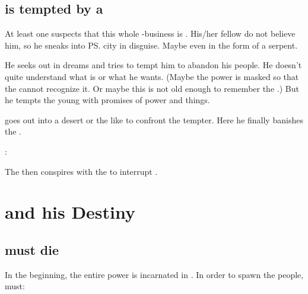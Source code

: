 \subsection{\Thanatzil{} is tempted by a \dragon}
At least one \dragon{} suspects that this whole \Thanatzil-business is . His/her fellow \dragons{} do not believe him, so he sneaks into \ps{\Semiza}{} city in disguise. Maybe even in the form of a serpent. 

He seeks out \Thanatzil{} in dreams and tries to tempt him to abandon his people. He doesn't quite understand what \Thanatzil{} is or what he wants. (Maybe the \bane{} power is masked so that the \dragons{} cannot recognize it. Or maybe this \dragon{} is not old enough to remember the \firstbanewar.) But he tempts the young \resphan{} with promises of power and things. 

\Thanatzil{} goes out into a desert or the like to confront the tempter. Here he finally banishes the \dragon. 

\Thanatzil: 

The \dragon{} then conspires with the  to interrupt . 















\section{\Thanatzil{} and his Destiny}
\subsection{\Thanatzil{} must die}
In the beginning, the entire \resphan{} power is incarnated in \Thanatzil. 
In order to spawn the \resphan{} people, \Thanatzil must:

